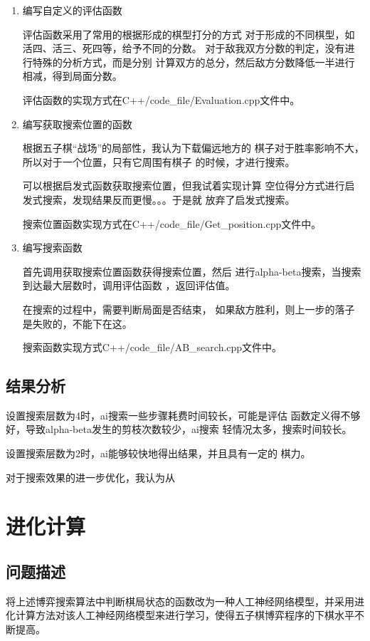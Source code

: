 \documentclass[UTF8]{article}
\begin{document}
\begin{enumerate}
    \item 编写自定义的评估函数
    
    \subitem 评估函数采用了常用的根据形成的棋型打分的方式
    对于形成的不同棋型，如活四、活三、死四等，给予不同的分数。
    对于敌我双方分数的判定，没有进行特殊的分析方式，而是分别
    计算双方的总分，然后敌方分数降低一半进行相减，得到局面分数。

    \subitem 评估函数的实现方式在C++/code\_file/Evaluation.cpp文件中。
    \item 编写获取搜索位置的函数
    
    \subitem 根据五子棋“战场”的局部性，我认为下载偏远地方的
    棋子对于胜率影响不大，所以对于一个位置，只有它周围有棋子
    的时候，才进行搜索。

    \subitem 可以根据启发式函数获取搜索位置，但我试着实现计算
    空位得分方式进行启发式搜索，发现结果反而更慢。。。于是就
    放弃了启发式搜索。

    \subitem 搜索位置函数实现方式在C++/code\_file/Get\_position.cpp文件中。
    \item 编写搜索函数
    
    \subitem 首先调用获取搜索位置函数获得搜索位置，然后
    进行alpha-beta搜索，当搜索到达最大层数时，调用评估函数
    ，返回评估值。

    \subitem 在搜索的过程中，需要判断局面是否结束，
    如果敌方胜利，则上一步的落子是失败的，不能下在这。

    \subitem 搜索函数实现方式C++/code\_file/AB\_search.cpp文件中。

\end{enumerate}

\subsection{结果分析}

设置搜索层数为4时，ai搜索一些步骤耗费时间较长，可能是评估
函数定义得不够好，导致alpha-beta发生的剪枝次数较少，ai搜索
轻情况太多，搜索时间较长。

设置搜索层数为2时，ai能够较快地得出结果，并且具有一定的
棋力。

对于搜索效果的进一步优化，我认为从


\section{进化计算}
\subsection{问题描述}
将上述博弈搜索算法中判断棋局状态的函数改为一种人工神经网络模型，并采用进
化计算方法对该人工神经网络模型来进行学习，使得五子棋博弈程序的下棋水平不断提高。
\end{document}
